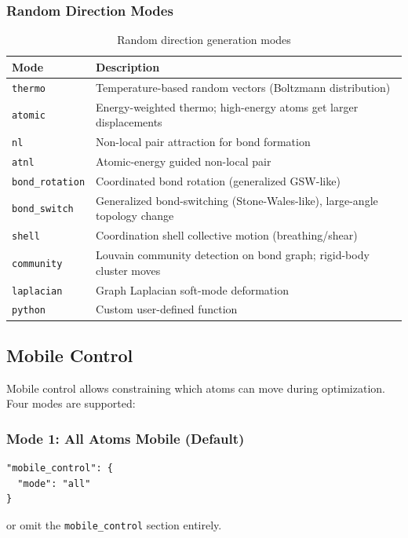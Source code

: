 \documentclass[11pt,a4paper]{article}
\begin{document}
\subsubsection{Random Direction Modes}
\begin{table}[h]
\centering
\begin{tabular}{ll}
\toprule
\textbf{Mode} & \textbf{Description} \\
\midrule
\texttt{thermo} & Temperature-based random vectors (Boltzmann distribution) \\
\texttt{atomic} & Energy-weighted thermo; high-energy atoms get larger displacements \\
\texttt{nl} & Non-local pair attraction for bond formation \\
\texttt{atnl} & Atomic-energy guided non-local pair \\
\texttt{bond\_rotation} & Coordinated bond rotation (generalized GSW-like) \\
\texttt{bond\_switch} & Generalized bond-switching (Stone-Wales-like), large-angle topology change \\
\texttt{shell} & Coordination shell collective motion (breathing/shear) \\
\texttt{community} & Louvain community detection on bond graph; rigid-body cluster moves \\
\texttt{laplacian} & Graph Laplacian soft-mode deformation \\
\texttt{python} & Custom user-defined function \\
\bottomrule
\end{tabular}
\caption{Random direction generation modes}
\end{table}

\subsection{Mobile Control}

Mobile control allows constraining which atoms can move during optimization. Four modes are supported:

\subsubsection{Mode 1: All Atoms Mobile (Default)}
\begin{lstlisting}[style=jsonStyle]
"mobile_control": {
  "mode": "all"
}
\end{lstlisting}
or omit the \texttt{mobile\_control} section entirely.
\end{document}
